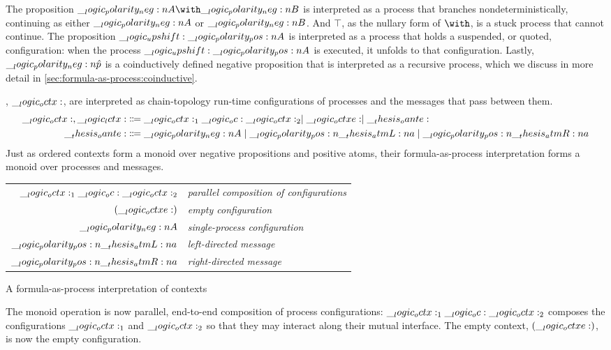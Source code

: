   The proposition $\n{A} \with \n{B}$ is interpreted as a process that branches nondeterministically, continuing as either $\__logic_polarity_neg:n {A}$ or $\__logic_polarity_neg:n {B}$.
  And $\top$, as the nullary form of $\with$, is a stuck process that cannot continue.
  The proposition $\__logic_upshift: \__logic_polarity_pos:n {A}$ is interpreted as a process that holds a suspended, or quoted, configuration:
  when the process $\__logic_upshift: \__logic_polarity_pos:n {A}$ is executed, it unfolds to that configuration.
  Lastly, $\__logic_polarity_neg:n {\hat{p}}$ is a coinductively defined negative proposition that is interpreted as a recursive process, which we discuss in more detail in \cref{sec:formula-as-process:coinductive}.

, $\__logic_octx:$, are interpreted as chain-topology run-time configurations of processes and the messages that pass between them.
\begin{align*}
  \__logic_octx: , \__logic_lctx: &\Coloneqq \__logic_octx:_1 \__logic_oc: \__logic_octx:_2 \mid \__logic_octxe: \mid \__thesis_oante: \\
  \__thesis_oante: &\Coloneqq \__logic_polarity_neg:n {A} \mid \__logic_polarity_pos:n {\__thesis_atmL:n {a}} \mid \__logic_polarity_pos:n {\__thesis_atmR:n {a}}
\end{align*}
Just as ordered contexts form a monoid over negative propositions and positive atoms, their formula-as-process interpretation forms a monoid over processes and messages.
%
\begin{margintable}
  \begin{center}
    \begin{tabular}{@{}r@{\enspace}>{\itshape}l@{}}
      $\__logic_octx:_1 \__logic_oc: \__logic_octx:_2$ & parallel composition of configurations \\
      $(\__logic_octxe:)$ & empty configuration \\
      $\__logic_polarity_neg:n {A}$ & single-process configuration \\
      $\__logic_polarity_pos:n {\__thesis_atmL:n {a}}$ & left-directed message \\
      $\__logic_polarity_pos:n {\__thesis_atmR:n {a}}$ & right-directed message
    \end{tabular}
  \end{center}
  \caption{A formula-as-process interpretation of contexts}\label{fig:choreographies:ctxprop-table}
\end{margintable}%
%
The monoid operation is now parallel, end-to-end composition of process configurations: $\__logic_octx:_1 \__logic_oc: \__logic_octx:_2$ composes the configurations $\__logic_octx:_1$ and $\__logic_octx:_2$ so that they may interact along their mutual interface.
The empty context, $(\__logic_octxe:)$, is now the empty configuration.

